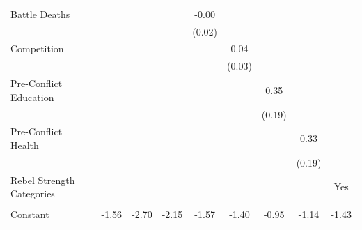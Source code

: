 \documentclass[12pt, letterpaper]{article}
\begin{document}
\begin{table}[htbp]
\begin{small}
\begin{tabular}{l*{8}{c}}
Battle Deaths       &                     &                     &                     &       -0.00         &                     &                     &                     &                     \\
                    &                     &                     &                     &      (0.02)         &                     &                     &                     &                     \\
Competition         &                     &                     &                     &                     &        0.04\sym{*}  &                     &                     &                     \\
                    &                     &                     &                     &                     &      (0.03)         &                     &                     &                     \\
Pre-Conflict Education&                     &                     &                     &                     &                     &        0.35\sym{*}  &                     &                     \\
                    &                     &                     &                     &                     &                     &      (0.19)         &                     &                     \\
Pre-Conflict Health &                     &                     &                     &                     &                     &                     &        0.33\sym{*}  &                     \\
                    &                     &                     &                     &                     &                     &                     &      (0.19)         &                     \\
Rebel Strength Categories      &                     &                     &                     &                     &                     &                     &                     &        Yes         \\
                    &                     &                     &                     &                     &                     &                     &                     &               \\
Constant            &       -1.56\sym{+}  &       -2.70\sym{*}  &       -2.15\sym{+}  &       -1.57         &       -1.40         &       -0.95         &       -1.14         &       -1.43         \\

\end{tabular}
\end{small}
\end{table}
\end{document}
